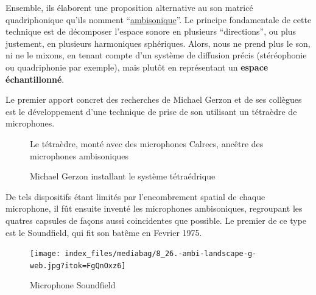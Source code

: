 \documentclass[
  letterpaper,
  DIV=11,
  numbers=noendperiod]{scrreprt}
\begin{document}
Ensemble, ils élaborent une proposition alternative au son matricé
quadriphonique qu'ils nomment
``\href{https://intothesoundfield.music.ox.ac.uk}{ambisonique}''. Le
principe fondamentale de cette technique est de décomposer l'espace
sonore en plusieurs ``directions'', ou plus justement, en plusieurs
harmoniques sphériques. Alors, nous ne prend plus le son, ni ne le
mixons, en tenant compte d'un système de diffusion précis (stéréophonie
ou quadriphonie par exemple), mais plutôt en représentant un
\textbf{espace échantillonné}.

Le premier apport concret des recherches de Michael Gerzon et de ses
collègues est le développement d'une technique de prise de son utilisant
un tétraèdre de microphones.

\begin{figure}

\begin{minipage}[t]{0.50\linewidth}

{\centering 


\caption{Le tétraèdre, monté avec des microphones Calrecs, ancêtre des
microphones ambisoniques}

}

\end{minipage}%
%
\begin{minipage}[t]{0.50\linewidth}

{\centering 


\caption{Michael Gerzon installant le système tétraédrique}

}

\end{minipage}%

\end{figure}

De tels dispositifs étant limités par l'encombrement spatial de chaque
microphone, il fût ensuite inventé les microphones ambisoniques,
regroupant les quatres capsules de façons aussi coincidentes que
possible. Le premier de ce type est le Soundfield, qui fit son batême en
Fevrier 1975.

\begin{figure}

{\centering \texttt{[image: index\_files/mediabag/8\_26.-ambi-landscape-g-web.jpg?itok=FgQnOxz6]}

}

\caption{Microphone Soundfield}

\end{figure}
\end{document}
